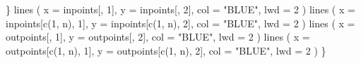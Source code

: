 \documentclass[
  12pt,
]{book}
\newenvironment{Shaded}{\begin{snugshade}}{\end{snugshade}}
\newcommand{\AttributeTok}[1]{\textcolor[rgb]{0.77,0.63,0.00}{#1}}
\newcommand{\DecValTok}[1]{\textcolor[rgb]{0.00,0.00,0.81}{#1}}
\newcommand{\FunctionTok}[1]{\textcolor[rgb]{0.00,0.00,0.00}{#1}}
\newcommand{\NormalTok}[1]{#1}
\newcommand{\StringTok}[1]{\textcolor[rgb]{0.31,0.60,0.02}{#1}}
\theoremstyle{definition}
\theoremstyle{definition}
\theoremstyle{definition}
\theoremstyle{definition}
\theoremstyle{remark}
\begin{document}
\begin{Shaded}
\begin{Highlighting}[]
\NormalTok{  \}}
  \FunctionTok{lines}\NormalTok{ (}
    \AttributeTok{x =}\NormalTok{ inpoints[, }\DecValTok{1}\NormalTok{],}
    \AttributeTok{y =}\NormalTok{ inpoints[, }\DecValTok{2}\NormalTok{],}
    \AttributeTok{col =} \StringTok{"BLUE"}\NormalTok{,}
    \AttributeTok{lwd =} \DecValTok{2}
\NormalTok{  )}
  \FunctionTok{lines}\NormalTok{ (}
    \AttributeTok{x =}\NormalTok{ inpoints[}\FunctionTok{c}\NormalTok{(}\DecValTok{1}\NormalTok{, n), }\DecValTok{1}\NormalTok{],}
    \AttributeTok{y =}\NormalTok{ inpoints[}\FunctionTok{c}\NormalTok{(}\DecValTok{1}\NormalTok{, n), }\DecValTok{2}\NormalTok{],}
    \AttributeTok{col =} \StringTok{"BLUE"}\NormalTok{,}
    \AttributeTok{lwd =} \DecValTok{2}
\NormalTok{  )}
  \FunctionTok{lines}\NormalTok{ (}
    \AttributeTok{x =}\NormalTok{ outpoints[, }\DecValTok{1}\NormalTok{],}
    \AttributeTok{y =}\NormalTok{ outpoints[, }\DecValTok{2}\NormalTok{],}
    \AttributeTok{col =} \StringTok{"BLUE"}\NormalTok{,}
    \AttributeTok{lwd =} \DecValTok{2}
\NormalTok{  )}
  \FunctionTok{lines}\NormalTok{ (}
    \AttributeTok{x =}\NormalTok{ outpoints[}\FunctionTok{c}\NormalTok{(}\DecValTok{1}\NormalTok{, n), }\DecValTok{1}\NormalTok{],}
    \AttributeTok{y =}\NormalTok{ outpoints[}\FunctionTok{c}\NormalTok{(}\DecValTok{1}\NormalTok{, n), }\DecValTok{2}\NormalTok{],}
    \AttributeTok{col =} \StringTok{"BLUE"}\NormalTok{,}
    \AttributeTok{lwd =} \DecValTok{2}
\NormalTok{  )}
\NormalTok{\}}



\end{Highlighting}
\end{Shaded}
\end{document}
